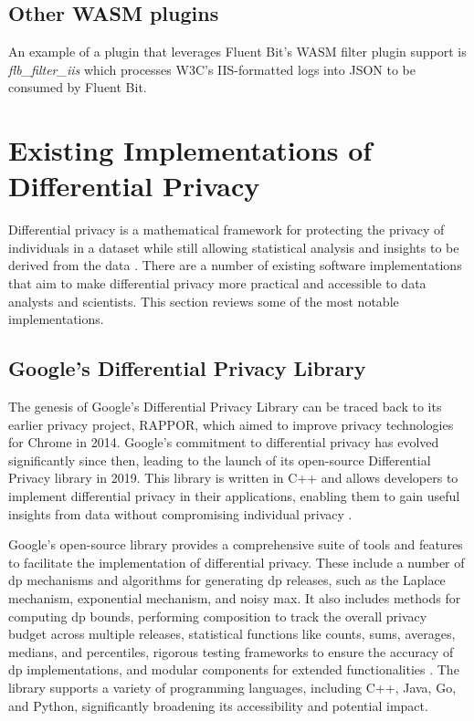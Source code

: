 \subsection{Other WASM plugins}
An example of a plugin that leverages Fluent Bit's WASM filter plugin support is \textit{flb\_filter\_iis}\cite{Ortega} which processes W3C's IIS-formatted logs into JSON to be consumed by Fluent Bit.

\section{Existing Implementations of Differential Privacy}

Differential privacy is a mathematical framework for protecting the privacy of individuals in a dataset while still allowing statistical analysis and insights to be derived from the data \cite{Dwork2006calibrating, Dwork2014}. There are a number of existing software implementations that aim to make differential privacy more practical and accessible to data analysts and scientists. This section reviews some of the most notable implementations.

\subsection{Google's Differential Privacy Library}

The genesis of Google's Differential Privacy Library can be traced back to its earlier privacy project, RAPPOR, which aimed to improve privacy technologies for Chrome in 2014. Google's commitment to differential privacy has evolved significantly since then, leading to the launch of its open-source Differential Privacy library in 2019. This library is written in C++ and allows developers to implement differential privacy in their applications, enabling them to gain useful insights from data without compromising individual privacy \cite{Guevara_2022, RAPPOR, wilson2019differentially}.

Google's open-source library provides a comprehensive suite of tools and features to facilitate the implementation of differential privacy. These include a number of \acrshort{dp} mechanisms and algorithms for generating \acrshort{dp} releases, such as the Laplace mechanism, exponential mechanism, and noisy max. It also includes methods for computing \acrshort{dp} bounds, performing composition to track the overall privacy budget across multiple releases, statistical functions like counts, sums, averages, medians, and percentiles, rigorous testing frameworks to ensure the accuracy of \acrshort{dp} implementations, and modular components for extended functionalities \cite{wilson2019differentially, wilson2020differentially, RAPPOR}. The library supports a variety of programming languages, including C++, Java, Go, and Python, significantly broadening its accessibility and potential impact.

